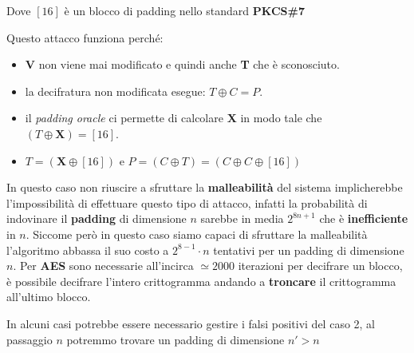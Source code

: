 \begin{boxA}
\begin{enumerate}[nosep]
        Dove $[16]$ è un blocco di padding nello standard \textbf{PKCS\#7}
    \end{enumerate}
    Questo attacco funziona perché:
    \begin{itemize}[nosep]
        \item \textbf{V} non viene mai modificato e quindi anche \textbf{T} che è sconosciuto.
        \item la decifratura non modificata esegue: $T \oplus C = P$.
        \item il \textit{padding oracle} ci permette di calcolare \textbf{X} in modo tale che $(T \oplus \mathbf{X}) = [16]$.
        \item $T = (\mathbf{X} \oplus [16])$ e $P = (C \oplus T) = (C \oplus C \oplus [16])$
    \end{itemize}
\end{boxA}

\newpage

\begin{flushleft}
    In questo caso non riuscire a sfruttare la \textbf{malleabilità} del sistema implicherebbe l'impossibilità di effettuare questo tipo di attacco, infatti la probabilità di indovinare il \textbf{padding} di dimensione $n$ sarebbe in media $2^{8n + 1}$ che è \textbf{inefficiente} in $n$. Siccome però in questo caso siamo capaci di sfruttare la malleabilità l'algoritmo abbassa il suo costo a $2^{8 - 1} \cdot n$ tentativi per un padding di dimensione $n$. Per \textbf{AES} sono necessarie all'incirca $\simeq 2000$ iterazioni per decifrare un blocco, è possibile decifrare l'intero crittogramma andando a \textbf{troncare} il crittogramma all'ultimo blocco. 
    
    \smallskip

    In alcuni casi potrebbe essere necessario gestire i falsi positivi del caso 2, al passaggio $n$ potremmo trovare un padding di dimensione $n' > n$
\end{flushleft}

